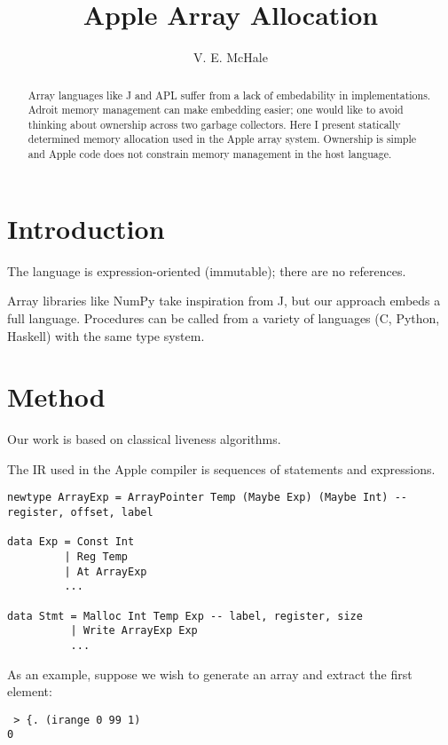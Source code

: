 \documentclass{article}
\begin{document}
\title{Apple Array Allocation}
\author{V. E. McHale}
\maketitle

\begin{abstract}
    Array languages like J and APL suffer from a lack of embedability in implementations. Adroit memory management can make embedding easier; one would like to avoid thinking about ownership across two garbage collectors. Here I present statically determined memory allocation used in the Apple array system. Ownership is simple and Apple code does not constrain memory management in the host language.
\end{abstract}

\section{Introduction}

The language is expression-oriented (immutable); there are no references.

Array libraries like NumPy take inspiration from J, but our approach embeds a full language. Procedures can be called from a variety of languages (C, Python, Haskell) with the same type system.

\section{Method}

Our work is based on classical liveness algorithms.

The IR used in the Apple compiler is sequences of statements and expressions.

\begin{verbatim}
newtype ArrayExp = ArrayPointer Temp (Maybe Exp) (Maybe Int) -- register, offset, label

data Exp = Const Int
         | Reg Temp
         | At ArrayExp
         ...

data Stmt = Malloc Int Temp Exp -- label, register, size
          | Write ArrayExp Exp
          ...
\end{verbatim}

As an example, suppose we wish to generate an array and extract the first element:

\begin{verbatim}
 > {. (irange 0 99 1)
0
\end{verbatim}
\end{document}
